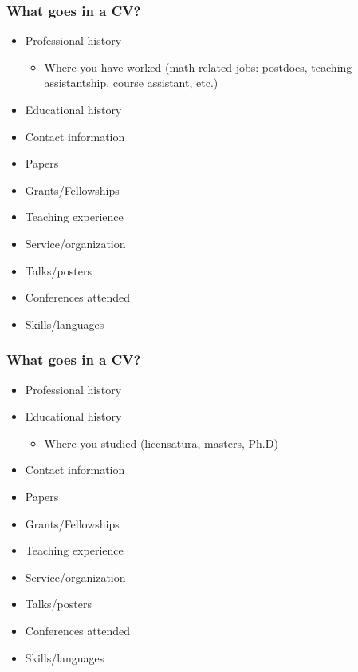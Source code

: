 \documentclass{beamer}
\begin{document}
\begin{frame}\frametitle{What goes in a CV?}

\begin{itemize}
	\item Professional history
	\begin{itemize}
		\item Where you have worked (math-related jobs: postdocs, teaching assistantship, course assistant, etc.)
	\end{itemize}
	\item Educational history
	\item Contact information
	\item Papers
	\item Grants/Fellowships
	\item Teaching experience
	\item Service/organization
	\item Talks/posters
	\item Conferences attended
	\item Skills/languages
\end{itemize}

\end{frame}

\begin{frame}\frametitle{What goes in a CV?}

\begin{itemize}
	\item Professional history
	\item Educational history
	\begin{itemize}
			\item Where you studied (licensatura, masters, Ph.D)
	\end{itemize}
	\item Contact information
	\item Papers
	\item Grants/Fellowships
	\item Teaching experience
	\item Service/organization
	\item Talks/posters
	\item Conferences attended
	\item Skills/languages
\end{itemize}

\end{frame}
\end{document}
